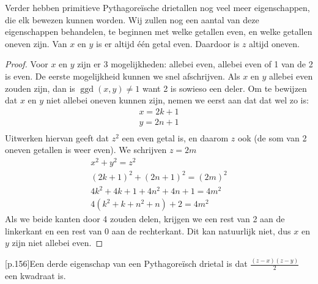 \documentclass[12pt,reqno]{article}
\theoremstyle{theorem}
\theoremstyle{definition}
\DeclareMathOperator{\ggd}{ggd}
\begin{document}
	Verder hebben primitieve Pythagore\"ische drietallen nog veel meer eigenschappen, die elk bewezen kunnen worden. Wij zullen nog een aantal van deze eigenschappen behandelen, te beginnen met welke getallen even, en welke getallen oneven zijn. Van $x$ en $y$ is er altijd \'e\'en getal even. Daardoor is $z$ altijd oneven.
	\begin{proof}
	Voor $x$ en $y$ zijn er 3 mogelijkheden: allebei even, allebei even of 1 van de 2 is even. De eerste mogelijkheid kunnen we snel afschrijven. Als $x$ en $y$ allebei even zouden zijn, dan is $\ggd(x,y) \neq 1$ want 2 is sowieso een deler. Om te bewijzen dat $x$ en $y$ niet allebei oneven kunnen zijn, nemen we eerst aan dat dat wel zo is:
	\begin{align*}
	x = 2k + 1\\
	y = 2n + 1\\
	\end{align*}
	Uitwerken hiervan geeft dat $z^2$ een even getal is, en daarom $z$ ook (de som van 2 oneven getallen is weer even). We schrijven $z = 2m$
	\begin{align*}
	x^2 + y^2 = z^2\\
	(2k + 1)^2 + (2n + 1)^2 = (2m)^2\\
	4k^2 + 4k + 1 +4n^2 + 4n + 1 = 4m^2\\
	4(k^2 + k + n^2 + n) + 2 = 4m^2
	\end{align*}
	Als we beide kanten door 4 zouden delen, krijgen we een rest van 2 aan de linkerkant en een rest van 0 aan de rechterkant. Dit kan natuurlijk niet, dus $x$ en $y$ zijn niet allebei even.
	\end{proof}
	\cite{Posamentier}[p.156]Een derde eigenschap van een Pythagore\"isch drietal is dat $\frac{(z-x)(z-y)}{2}$ een kwadraat is. 
	
\end{document}
